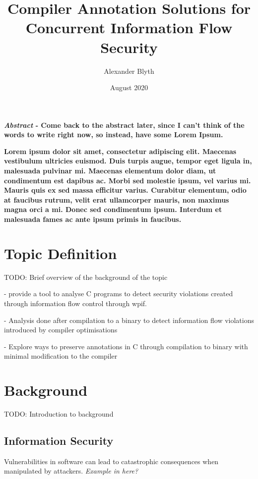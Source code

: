 \documentclass[twocolumn]{article}
\title{Compiler Annotation Solutions for Concurrent Information Flow Security}
\author{Alexander Blyth}
\date{August 2020}
\begin{document}
\maketitle



\textbf{\textit{Abstract} - Come back to the abstract later, since I can't think of the words to write right now, so instead, have some Lorem Ipsum.}

\textbf{Lorem ipsum dolor sit amet, consectetur adipiscing elit. Maecenas vestibulum ultricies euismod. Duis turpis augue, tempor eget ligula in, malesuada pulvinar mi. Maecenas elementum dolor diam, ut condimentum est dapibus ac. Morbi sed molestie ipsum, vel varius mi. Mauris quis ex sed massa efficitur varius. Curabitur elementum, odio at faucibus rutrum, velit erat ullamcorper mauris, non maximus magna orci a mi. Donec sed condimentum ipsum. Interdum et malesuada fames ac ante ipsum primis in faucibus.}

\section{Topic Definition}
TODO: Brief overview of the background of the topic

- provide a tool to analyse C programs to detect security violations created through information flow control through wpif.

- Analysis done after compilation to a binary to detect information flow violations introduced by compiler optimisations

- Explore ways to preserve annotations in C through compilation to binary with minimal modification to the compiler

\section{Background}
TODO: Introduction to background

\subsection{Information Security}
Vulnerabilities in software can lead to catastrophic consequences when manipulated by attackers. \textit{Example in here?}
\end{document}
